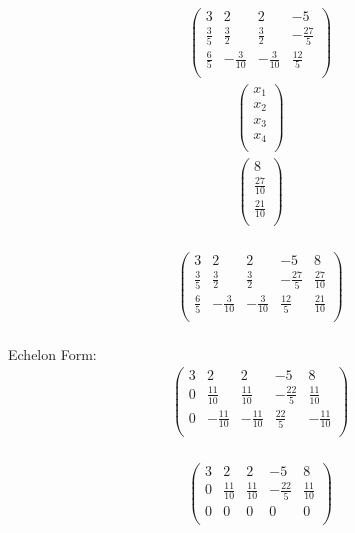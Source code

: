 \documentclass{article}
\begin{document}
\\
\begin{align*}
\begin{pmatrix}
3 & 2 & 2 & -5\\
\frac{3}{5} & \frac{3}{2} & \frac{3}{2} & -\frac{27}{5}\\
\frac{6}{5} & -\frac{3}{10} & -\frac{3}{10} & \frac{12}{5}\\
\end{pmatrix}
\end{align*}
\begin{align*}
\begin{pmatrix}
x_{1}\\
x_{2}\\
x_{3}\\
x_{4}\\
\end{pmatrix}
\end{align*}
\begin{align*}
\begin{pmatrix}
8\\
\frac{27}{10}\\
\frac{21}{10}\\
\end{pmatrix}
\end{align*}
\\
\begin{align*}
\left(
\begin{array}{cccc|c}
3 & 2 & 2 & -5 & 8\\
\frac{3}{5} & \frac{3}{2} & \frac{3}{2} & -\frac{27}{5} & \frac{27}{10}\\
\frac{6}{5} & -\frac{3}{10} & -\frac{3}{10} & \frac{12}{5} & \frac{21}{10}\\
\end{array}
\right)
\end{align*}
\\
Echelon Form:\\
\begin{align*}
\left(
\begin{array}{cccc|c}
3 & 2 & 2 & -5 & 8\\
0 & \frac{11}{10} & \frac{11}{10} & -\frac{22}{5} & \frac{11}{10}\\
0 & -\frac{11}{10} & -\frac{11}{10} & \frac{22}{5} & -\frac{11}{10}\\
\end{array}
\right)
\end{align*}
\\
\begin{align*}
\left(
\begin{array}{cccc|c}
3 & 2 & 2 & -5 & 8\\
0 & \frac{11}{10} & \frac{11}{10} & -\frac{22}{5} & \frac{11}{10}\\
0 & 0 & 0 & 0 & 0\\
\end{array}
\right)
\end{align*}
\end{document}
